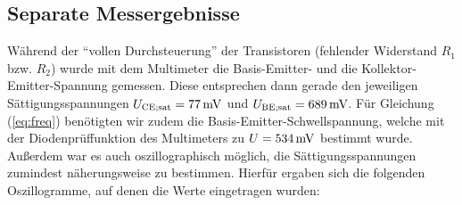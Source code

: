 \documentclass[numbers=noenddot,10pt,a4paper]{scrartcl}
\newcommand{\indx}[1]{_\text{#1}}
\begin{document}
\subsection{Separate Messergebnisse}
Während der "`vollen Durchsteuerung"' der Transistoren (fehlender Widerstand $R_1$ bzw. $R_2$) wurde mit dem Multimeter die Basis-Emitter- und die Kollektor-Emitter-Spannung gemessen. Diese entsprechen dann gerade den jeweiligen Sättigungsspannungen $U\indx{CE;sat}=\unit[77]{mV}$ und $U\indx{BE;sat}=\unit[689]{mV}$. Für Gleichung (\ref{eq:freq}) benötigten wir zudem die Basis-Emitter-Schwellspannung, welche mit der Diodenprüffunktion des Multimeters zu $U\index{BE;Schw}=\unit[534]{mV}$ bestimmt wurde. \\
Außerdem war es auch oszillographisch möglich, die Sättigungsspannungen zumindest näherungsweise zu bestimmen. Hierfür ergaben sich die folgenden Oszillogramme, auf denen die Werte eingetragen wurden:
\end{document}
